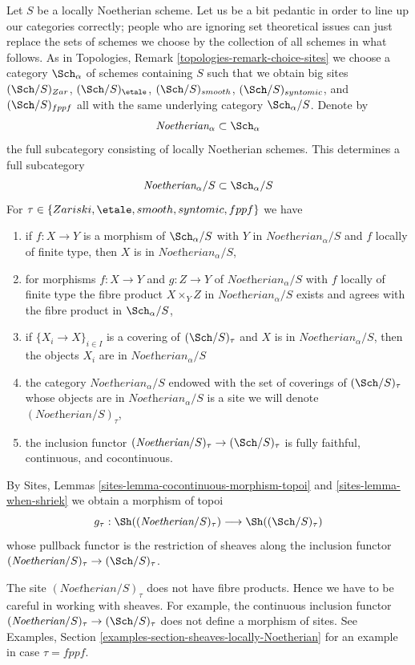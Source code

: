 \medskip\noindent
Let $S$ be a locally Noetherian scheme. Let us be a bit pedantic in order
to line up our categories correctly; people who are ignoring set theoretical
issues can just replace the sets of schemes we choose by the collection
of all schemes in what follows. As in
Topologies, Remark \ref{topologies-remark-choice-sites}
we choose a category $\Sch_\alpha$ of schemes containing
$S$ such that we obtain big sites $(\Sch/S)_{Zar}$,
$(\Sch/S)_\etale$, $(\Sch/S)_{smooth}$, $(\Sch/S)_{syntomic}$,
and $(\Sch/S)_{fppf}$ all with the same underlying
category $\Sch_\alpha/S$. Denote by
$$
\textit{Noetherian}_\alpha \subset \Sch_\alpha
$$
the full subcategory consisting of locally Noetherian schemes.
This determines a full subcategory
$$
\textit{Noetherian}_\alpha/S \subset \Sch_\alpha/S
$$
For $\tau \in \{Zariski, \etale, smooth, syntomic, fppf\}$ we have
\begin{enumerate}
\item if $f : X \to Y$ is a morphism of $\Sch_\alpha/S$
with $Y$ in $\textit{Noetherian}_\alpha/S$ and
$f$ locally of finite type, then $X$ is in $\textit{Noetherian}_\alpha/S$,
\item for morphisms $f : X \to Y$ and $g : Z \to Y$ of
$\textit{Noetherian}_\alpha/S$ with $f$ locally of finite type
the fibre product $X \times_Y Z$ in $\textit{Noetherian}_\alpha/S$
exists and agrees with the fibre product in $\Sch_\alpha/S$,
\item if $\{X_i \to X\}_{i \in I}$ is a covering of
$(\Sch/S)_\tau$ and $X$ is in $\textit{Noetherian}_\alpha/S$,
then the objects $X_i$ are in $\textit{Noetherian}_\alpha/S$
\item the category $\textit{Noetherian}_\alpha/S$ endowed
with the set of coverings of $(\Sch/S)_\tau$ whose objects
are in $\textit{Noetherian}_\alpha/S$ is a site
we will denote $(\textit{Noetherian}/S)_\tau$,
\item the inclusion functor
$(\textit{Noetherian}/S)_\tau \to (\Sch/S)_\tau$
is fully faithful, continuous, and cocontinuous.
\end{enumerate}
By Sites, Lemmas \ref{sites-lemma-cocontinuous-morphism-topoi} and
\ref{sites-lemma-when-shriek} we obtain a morphism of topoi
$$
g_\tau : \Sh((\textit{Noetherian}/S)_\tau) \longrightarrow \Sh((\Sch/S)_\tau)
$$
whose pullback functor is the restriction of sheaves along
the inclusion functor $(\textit{Noetherian}/S)_\tau \to (\Sch/S)_\tau$.

\begin{remark}[Warning]
\label{remark-no-fibre-products}
The site $(\textit{Noetherian}/S)_\tau$ does not have fibre products.
Hence we have to be careful in working with sheaves. For example,
the continuous inclusion functor
$(\textit{Noetherian}/S)_\tau \to (\Sch/S)_\tau$
does not define a morphism of sites. See
Examples, Section \ref{examples-section-sheaves-locally-Noetherian}
for an example in case $\tau = fppf$.
\end{remark}

